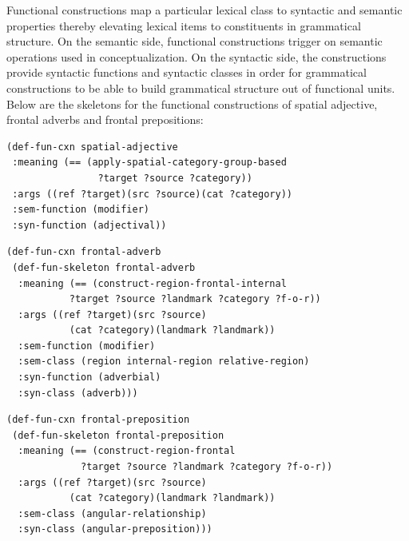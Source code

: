 Functional constructions map a particular lexical 
class to syntactic and semantic properties thereby
elevating lexical items to constituents in grammatical structure. 
On the semantic side, functional constructions trigger on semantic operations 
used in conceptualization. On the syntactic side, the constructions 
provide syntactic functions and syntactic classes in order for grammatical constructions 
to be able to build grammatical structure out of functional units.
Below are the skeletons for the functional constructions of spatial 
adjective, frontal adverbs and frontal prepositions:

\begin{example}
\label{e:def-fun-spatial-adjective}
\begin{footnotesize}
\begin{Verbatim}[commandchars=\\\{\}]
(def-fun-cxn spatial-adjective 
 :meaning (== (apply-spatial-category-group-based 
                ?target ?source ?category))
 :args ((ref ?target)(src ?source)(cat ?category))
 :sem-function (modifier)
 :syn-function (adjectival))
\end{Verbatim}
\end{footnotesize}
\end{example}

\begin{example}
\label{e:def-fun-frontal-adverb}
\begin{footnotesize}
\begin{Verbatim}[commandchars=\\\{\}]
(def-fun-cxn frontal-adverb 
 (def-fun-skeleton frontal-adverb
  :meaning (== (construct-region-frontal-internal
           ?target ?source ?landmark ?category ?f-o-r))
  :args ((ref ?target)(src ?source)
           (cat ?category)(landmark ?landmark))
  :sem-function (modifier)
  :sem-class (region internal-region relative-region)
  :syn-function (adverbial)
  :syn-class (adverb)))
\end{Verbatim}
\end{footnotesize}
\end{example}

\begin{example}
\label{e:def-fun-frontal-preposition}
\begin{footnotesize}
\begin{Verbatim}[commandchars=\\\{\}]
(def-fun-cxn frontal-preposition
 (def-fun-skeleton frontal-preposition
  :meaning (== (construct-region-frontal 
             ?target ?source ?landmark ?category ?f-o-r))
  :args ((ref ?target)(src ?source)
           (cat ?category)(landmark ?landmark))
  :sem-class (angular-relationship)
  :syn-class (angular-preposition)))
\end{Verbatim}
\end{footnotesize}
\end{example}

